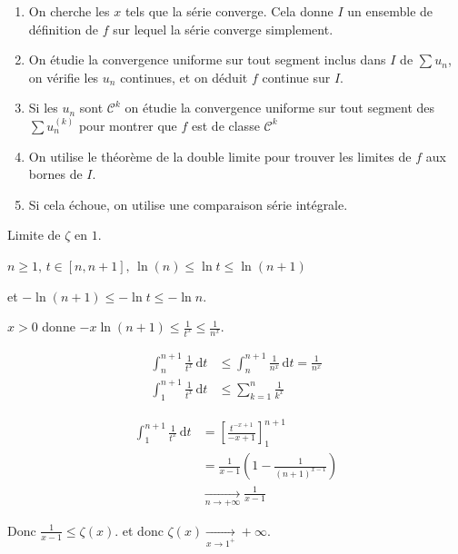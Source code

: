 \begin{enumerate}
    \item On cherche les $x$ tels que la série converge. Cela donne $I$ un ensemble de définition 
    de $f$ sur lequel la série converge simplement.
    \item On étudie la convergence uniforme sur tout segment inclus dans $I$ de $\sum u_n$, on vérifie 
    les $u_n$ continues, et on déduit $f$ continue sur $I$.
    \item Si les $u_n$ sont $\mathscr C^k$ on étudie la convergence uniforme sur tout segment des 
    $\sum u_n^{(k)}$ pour montrer que $f$ est de classe $\mathscr{C}^k$ 
    \item On utilise le théorème de la double limite pour trouver les limites de $f$ aux bornes 
    de $I$. 
    \item Si cela échoue, on utilise une comparaison série intégrale. 
\end{enumerate}

\begin{exemple}
    Limite de $\zeta$ en $1$.

    $n \geqslant 1, \, t \in [n, n+ 1], \, \ln(n) \leqslant \ln t \leqslant \ln (n+ 1)$
    
    et $-\ln(n + 1) \leqslant - \ln t \leqslant - \ln n$.

    $x > 0$ donne $- x \ln(n + 1) \leqslant \frac 1 {t^x} \leqslant \frac 1 {n^x}$.

    \begin{align*}
        \int_n^{n + 1} \frac 1 {t^x} \,\mathrm{d}t & \leqslant \int_n^{n + 1} \frac 1 {n^x} \,\mathrm{d}t = \frac 1 {n^x} \\
        \int_1^{n + 1} \frac 1 {t^x} \, \mathrm{d}t & \leqslant \sum_{k = 1 }^{n } \frac 1 {k^x} 
    \end{align*}

    \begin{align*}
        \int_{1 }^{n + 1 } \frac 1 {t^x} \, \mathrm{d}t &  = \left[ \frac{t^{- x + 1}}{- x + 1} \right]_{1}^{n + 1} \\
        & = \frac{1 }{x - 1} \left( 1 - \frac 1 {(n + 1)^{x - 1}} \right)\\
        & \xrightarrow[n \to + \infty]{} \frac 1 {x - 1}
    \end{align*} 

    Donc $\frac 1 {x - 1} \leqslant \zeta(x)$. et donc $\zeta(x) \xrightarrow[x \to 1^+]{} + \infty$.
\end{exemple}


